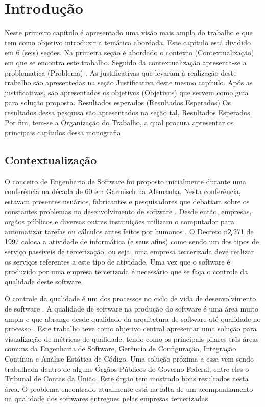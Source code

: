 \chapter[Introdução]{Introdução}
	Neste primeiro capítulo é apresentado uma visão mais ampla do trabalho e que tem como objetivo introduzir a temática abordada. Este capítulo está dividido em 6 (seis) seções. Na primeira seção é abordado o contexto (Contextualização) em que se encontra este trabalho. Seguido da contextualização apresenta-se a problematica (Problema) . As justificativas que levaram à realização deste trabalho são apresentedas na seção Justificativa deste mesmo capítulo. Após as justificativas, são apresentados os objetivos (Objetivos) que servem como guia para solução proposta. Resultados esperados (Resultados Esperados) Os resultados dessa pesquisa  são apresentados na seção tal, Resultados Esperados. Por fim, tem-se a Organização do Trabalho, a qual procura apresentar os principais capítulos dessa monografia.


\section{Contextualização}
	O conceito de Engenharia de Software foi proposto inicialmente durante uma conferência na década de 60 em Garmisch na Alemanha. Nesta conferência, estavam presentes usuários, fabricantes e pesquisadores que debatiam sobre os constantes problemas no desenvolvimento de software \cite{Paduelli}. Desde então, empresas, orgãos públicos e diversas outras instituições utilizam o computador para automatizar tarefas ou cálculos antes feitos por humanos \cite{fonseca2007historia}. O Decreto n\c 2.271 de 1997 \cite{decreto_2271} coloca a atividade de informática (e seus afins) como sendo um dos tipos de serviço passíveis de tercerização, ou seja, uma empresa tercerizada deve realizar os serviços referentes a este tipo de atividade. Uma vez que o software é produzido por uma empresa tercerizada é necessário que se faça o controle da qualidade deste software.

O controle da qualidade é um dos processos no ciclo de vida de desenvolvimento de software \cite{machado_metricas_2004}. A qualidade de software na produção do software é uma área muito ampla e que abrange desde qualidade da arquitetura de software até qualidade no processo . Este trabalho teve como objetivo central apresentar uma solução para visualização de métricas de qualidade, tendo como os principais pilares três áreas comuns da Engenharia de Software, Gerência de Configuração, Integração Contínua e Análise Estática de Código. Uma solução próxima a essa vem sendo trabalhada dentro de alguns Órgãos Públicos do Governo Federal, entre eles o Tribunal de Contas da União. Este órgão tem mostrado bons resultados nesta área. O problema encontrado atualmente está na falta de um acompanhamento na qualidade dos softwares entregues pelas empresas tercerizadas 	

